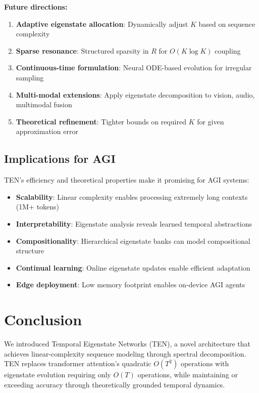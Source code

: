 \documentclass[11pt,letterpaper]{article}
\begin{document}
\textbf{Future directions:}
\begin{enumerate}
    \item \textbf{Adaptive eigenstate allocation}: Dynamically adjust $K$ based on sequence complexity
    
    \item \textbf{Sparse resonance}: Structured sparsity in $R$ for $O(K \log K)$ coupling
    
    \item \textbf{Continuous-time formulation}: Neural ODE-based evolution for irregular sampling
    
    \item \textbf{Multi-modal extensions}: Apply eigenstate decomposition to vision, audio, multimodal fusion
    
    \item \textbf{Theoretical refinement}: Tighter bounds on required $K$ for given approximation error
\end{enumerate}

\subsection{Implications for AGI}

TEN's efficiency and theoretical properties make it promising for AGI systems:

\begin{itemize}
    \item \textbf{Scalability}: Linear complexity enables processing extremely long contexts (1M+ tokens)
    \item \textbf{Interpretability}: Eigenstate analysis reveals learned temporal abstractions
    \item \textbf{Compositionality}: Hierarchical eigenstate banks can model compositional structure
    \item \textbf{Continual learning}: Online eigenstate updates enable efficient adaptation
    \item \textbf{Edge deployment}: Low memory footprint enables on-device AGI agents
\end{itemize}

\section{Conclusion}

We introduced Temporal Eigenstate Networks (TEN), a novel architecture that achieves linear-complexity sequence modeling through spectral decomposition. TEN replaces transformer attention's quadratic $O(T^2)$ operations with eigenstate evolution requiring only $O(T)$ operations, while maintaining or exceeding accuracy through theoretically grounded temporal dynamics.
\end{document}
